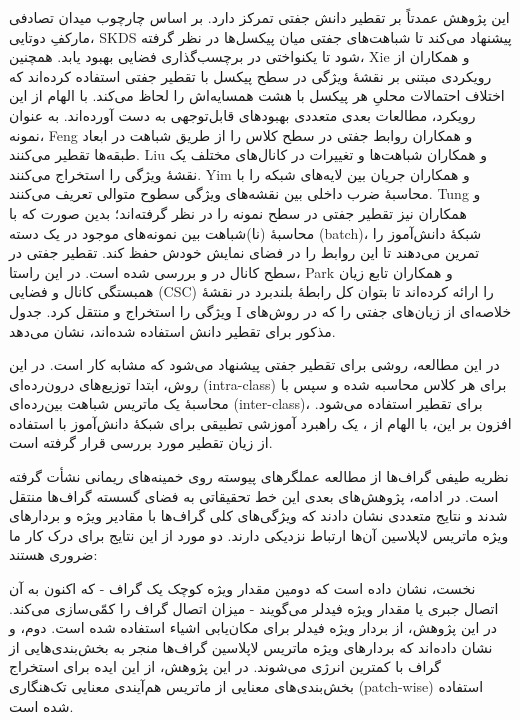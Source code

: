 این پژوهش عمدتاً بر تقطیر دانش جفتی تمرکز دارد. بر اساس چارچوب میدان تصادفی مارکفِ دوتایی، SKDS پیشنهاد می‌کند تا شباهت‌های جفتی میان پیکسل‌ها در نظر گرفته شود تا یکنواختی در برچسب‌گذاری فضایی بهبود یابد. همچنین، Xie و همکاران \cite{xie2018improvingfastsegmentationteacherstudent} از رویکردی مبتنی بر نقشهٔ ویژگی در سطح پیکسل با تقطیر جفتی استفاده کرده‌اند که اختلاف احتمالات محلیِ هر پیکسل با هشت همسایه‌اش را لحاظ می‌کند. با الهام از این رویکرد، مطالعات بعدی متعددی بهبودهای قابل‌توجهی به دست آورده‌اند. به عنوان نمونه، Feng و همکاران \cite{Feng_2021} روابط جفتی در سطح کلاس را از طریق شباهت در ابعاد طبقه‌ها تقطیر می‌کنند. Liu و همکاران \cite{liu2022exploringinterchannelcorrelationdiversitypreserved} شباهت‌ها و تغییرات در کانال‌های مختلف یک نقشهٔ ویژگی را استخراج می‌کنند. Yim و همکاران \cite{8100237} جریان بین لایه‌های شبکه را با محاسبهٔ ضرب داخلی بین نقشه‌های ویژگی سطوح متوالی تعریف می‌کنند. Tung و همکاران \cite{tung2019similaritypreservingknowledgedistillation} نیز تقطیر جفتی در سطح نمونه را در نظر گرفته‌اند؛ بدین صورت که با محاسبهٔ (نا)شباهت بین نمونه‌های موجود در یک دسته (batch)، شبکهٔ دانش‌آموز را تمرین می‌دهند تا این روابط را در فضای نمایش خودش حفظ کند. تقطیر جفتی در سطح کانال در \cite{s20164616} و \cite{liu2022exploringinterchannelcorrelationdiversitypreserved} بررسی شده است. در این راستا، Park و همکاران \cite{s20164616} تابع زیان همبستگی کانال و فضایی (CSC) را ارائه کرده‌اند تا بتوان کل رابطهٔ بلندبرد در نقشهٔ ویژگی را استخراج و منتقل کرد. جدول I خلاصه‌ای از زیان‌های جفتی را که در روش‌های مذکور برای تقطیر دانش استفاده شده‌اند، نشان می‌دهد.

در این مطالعه، روشی برای تقطیر جفتی پیشنهاد می‌شود که مشابه کار \cite{liu2022exploringinterchannelcorrelationdiversitypreserved} است. در این روش، ابتدا توزیع‌های درون‌رده‌ای (intra-class) برای هر کلاس محاسبه شده و سپس با محاسبهٔ یک ماتریس شباهت بین‌رده‌ای (inter-class)، برای تقطیر استفاده می‌شود. افزون بر این، با الهام از \cite{zhou2020channeldistillationchannelwiseattention}، یک راهبرد آموزشی تطبیقی برای شبکهٔ دانش‌آموز با استفاده از زیان تقطیر مورد بررسی قرار گرفته است.




نظریه طیفی گراف‌ها از مطالعه عملگرهای پیوسته روی خمینه‌های ریمانی \cite{Cheeger} نشأت گرفته است. در ادامه، پژوهش‌های بعدی این خط تحقیقاتی به فضای گسسته گراف‌ها منتقل شدند و نتایج متعددی نشان دادند که ویژگی‌های کلی گراف‌ها با مقادیر ویژه و بردارهای ویژه ماتریس لاپلاسین آن‌ها ارتباط نزدیکی دارند. دو مورد از این نتایج برای درک کار ما ضروری هستند:

نخست، \cite{Fiedler1973} نشان داده است که دومین مقدار ویژه کوچک یک گراف - که اکنون به آن اتصال جبری یا مقدار ویژه فیدلر می‌گویند - میزان اتصال گراف را کمّی‌سازی می‌کند. در این پژوهش، از بردار ویژه فیدلر برای مکان‌یابی اشیاء استفاده شده است. دوم، \cite{Donath1973LowerBF} و \cite{Fiedler1973} نشان داده‌اند که بردارهای ویژه ماتریس لاپلاسین گراف‌ها منجر به بخش‌بندی‌هایی از گراف با کمترین انرژی می‌شوند. در این پژوهش، از این ایده برای استخراج بخش‌بندی‌های معنایی از ماتریس هم‌آیندی معنایی تک‌هنگاری (patch-wise) استفاده شده است.


